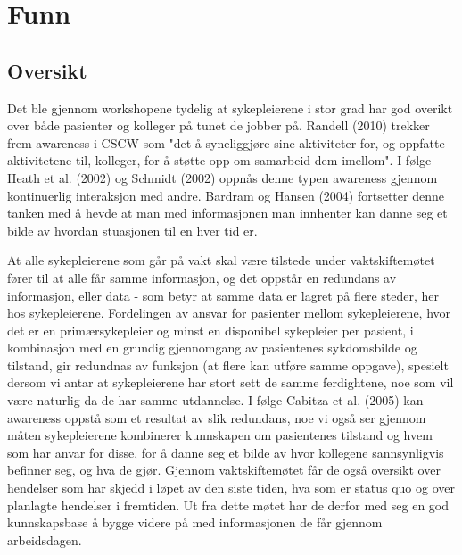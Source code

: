 \section{Funn}

\subsection{Oversikt}
\label{oversikt}
Det ble gjennom workshopene tydelig at sykepleierene i stor grad har god overikt over både pasienter og kolleger på tunet de jobber på. Randell (2010) trekker frem awareness i CSCW som "det å syneliggjøre sine aktiviteter for, og oppfatte aktivitetene til, kolleger, for å støtte opp om samarbeid dem imellom". I følge Heath et al. (2002) og Schmidt (2002) oppnås denne typen awareness gjennom kontinuerlig interaksjon med andre. Bardram og Hansen (2004) fortsetter denne tanken med å hevde at man med informasjonen man innhenter kan danne seg et bilde av hvordan stuasjonen til en hver tid er.

\noindent
At alle sykepleierene som går på vakt skal være tilstede under vaktskiftemøtet fører til at alle får samme informasjon, og det oppstår en redundans av informasjon, eller data - som betyr at samme data er lagret på flere steder, her hos sykepleierene. Fordelingen av ansvar for pasienter mellom sykepleierene, hvor det er en primærsykepleier og minst en disponibel sykepleier per pasient, i kombinasjon med en grundig gjennomgang av pasientenes sykdomsbilde og tilstand, gir redundnas av funksjon (at flere kan utføre samme oppgave), spesielt dersom vi antar at sykepleierene har stort sett de samme ferdightene, noe som vil være naturlig da de har samme utdannelse. I følge Cabitza et al. (2005) kan awareness oppstå som et resultat av slik redundans, noe vi også ser gjennom måten sykepleierene kombinerer kunnskapen om pasientenes tilstand og hvem som har anvar for disse, for å danne seg et bilde av hvor kollegene sannsynligvis befinner seg, og hva de gjør.
Gjennom vaktskiftemøtet får de også oversikt over hendelser som har skjedd i løpet av den siste tiden, hva som er status quo og over planlagte hendelser i fremtiden. Ut fra dette møtet har de derfor med seg en god kunnskapsbase å bygge videre på med informasjonen de får gjennom arbeidsdagen. 

